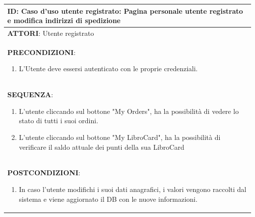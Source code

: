 \documentclass[a4paper,11pt]{report}
\begin{document}
\begin{table}[h!]
    \renewcommand*{\arraystretch}{1.2}
    \centering
    \begin{tabularx}{\textwidth}{|X|} \hline
      \textbf{ID}: Caso d'uso utente registrato: 
      \newline 
      Pagina personale utente registrato e modifica indirizzi di spedizione \\
      \hline
      \textbf{ATTORI}: Utente registrato \\
      \hline
      \textbf{PRECONDIZIONI}:
      \begin{enumerate}
        \item L'Utente deve essersi autenticato con le proprie credenziali.
      \end{enumerate} \\
      \hline
      \textbf{SEQUENZA}:
      \begin{enumerate}
        \item L'utente cliccando sul bottone "My Orders", ha la possibilità di vedere lo stato di tutti i suoi ordini.
        
        \item L'utente cliccando sul bottone "My LibroCard", ha la possibilità di verificare il saldo attuale dei punti della sua LibroCard
      \end{enumerate} \\
      \hline
      \textbf{POSTCONDIZIONI}:
      \begin{enumerate}
        \item In caso l'utente modifichi i suoi dati anagrafici, i valori vengono raccolti dal sistema e viene aggiornato il DB con le nuove informazioni.
      \end{enumerate} \\
      \hline 
    \end{tabularx}
  \end{table}  
\end{document}
